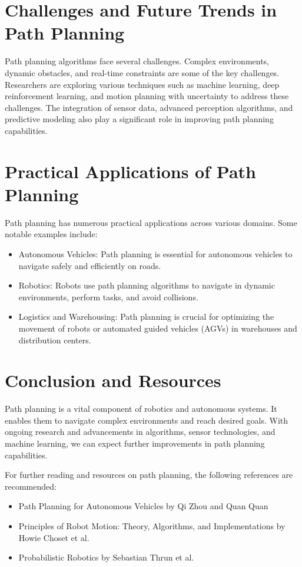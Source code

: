 \documentclass{article}
\begin{document}
\section*{Challenges and Future Trends in Path Planning}

Path planning algorithms face several challenges. Complex environments, dynamic obstacles, and real-time constraints are some of the key challenges. Researchers are exploring various techniques such as machine learning, deep reinforcement learning, and motion planning with uncertainty to address these challenges. The integration of sensor data, advanced perception algorithms, and predictive modeling also play a significant role in improving path planning capabilities.

\section*{Practical Applications of Path Planning}

Path planning has numerous practical applications across various domains. Some notable examples include:

\begin{itemize}
  \item Autonomous Vehicles: Path planning is essential for autonomous vehicles to navigate safely and efficiently on roads.
  
  \item Robotics: Robots use path planning algorithms to navigate in dynamic environments, perform tasks, and avoid collisions.
  
  \item Logistics and Warehousing: Path planning is crucial for optimizing the movement of robots or automated guided vehicles (AGVs) in warehouses and distribution centers.
\end{itemize}

\section*{Conclusion and Resources}

Path planning is a vital component of robotics and autonomous systems. It enables them to navigate complex environments and reach desired goals. With ongoing research and advancements in algorithms, sensor technologies, and machine learning, we can expect further improvements in path planning capabilities.

For further reading and resources on path planning, the following references are recommended:

\begin{itemize}
  \item Path Planning for Autonomous Vehicles by Qi Zhou and Quan Quan
  \item Principles of Robot Motion: Theory, Algorithms, and Implementations by Howie Choset et al.
  \item Probabilistic Robotics by Sebastian Thrun et al.
\end{itemize}
\end{document}
